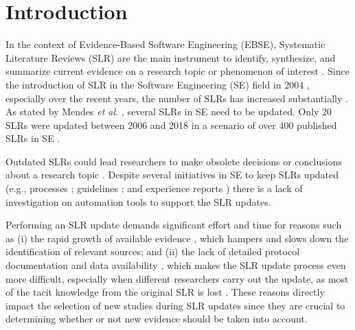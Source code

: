 \section{Introduction}
\label{sec:introduction}

In the context of Evidence-Based Software Engineering (EBSE), Systematic Literature Reviews (SLR) are the main instrument to identify, synthesize, and summarize current evidence on a research topic or phenomenon of interest \cite{Kitchenham15}. Since the introduction of SLR in the Software Engineering (SE) field in 2004 \cite{Kitchenham04}, especially over the recent years, the number of SLRs has increased substantially \cite{Mendes2020,Napoleao2021S}. As stated by Mendes \textit{et al.} \cite{Mendes2020}, several SLRs in SE need to be updated. Only 20 SLRs were updated between 2006 and 2018 in a scenario of over 400 published SLRs in SE \cite{Mendes2020}. 

Outdated SLRs could lead researchers to make obsolete decisions or conclusions about a research topic \cite{Watanabe20}. Despite several initiatives in SE to keep SLRs updated (e.g., processes \cite{Dieste08a, Mendes2020}; guidelines \cite{Wohlin2020, felizardo16}; and experience reports \cite{Garces17, Felizardo20}) there is a lack of investigation on automation tools to support the SLR updates.

Performing an SLR update demands significant effort and time for reasons such as (i) the rapid growth of available evidence \cite{Zhang18, Stol15}, which hampers and slows down the identification of relevant sources; and (ii) the lack of detailed protocol documentation and data availability \cite{Ampatzoglou2019, Zhou2015}, which makes the SLR update process even more difficult, especially when different researchers carry out the update, as most of the tacit knowledge from the original SLR is lost \cite{Felizardo20, Fabbri13}. These reasons directly impact the selection of new studies during SLR updates since they are crucial to determining whether or not new evidence should be taken into account.


